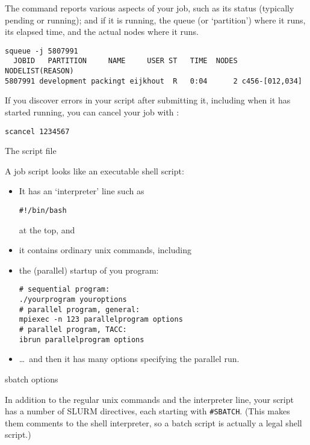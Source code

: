 The  command reports various aspects of your job,
such as its status (typically pending or running);
and if it is running, the queue (or `partition') where it runs,
its elapsed time, and the actual nodes where it runs.
\begin{verbatim}
squeue -j 5807991
  JOBID   PARTITION     NAME     USER ST   TIME  NODES NODELIST(REASON)
5807991 development packingt eijkhout  R   0:04      2 c456-[012,034]
\end{verbatim}

If you discover errors in your script after submitting it,
including when it has started running,
you can cancel your job with :
\begin{verbatim}
scancel 1234567
\end{verbatim}

 {The script file}

A job script looks like an executable shell script:
\begin{itemize}
\item It has an `interpreter' line such as
\begin{verbatim}
#!/bin/bash
\end{verbatim}
at the top, and
\item it contains ordinary unix commands, including
\item the (parallel) startup of you program:
\begin{verbatim}
# sequential program:
./yourprogram youroptions
# parallel program, general:
mpiexec -n 123 parallelprogram options
# parallel program, TACC:
ibrun parallelprogram options
\end{verbatim}
\item \ldots~and then it has many options specifying the parallel run.
\end{itemize}

 {sbatch options}

In addition to the regular unix commands and the interpreter line,
your script has a number of SLURM directives,
each starting with \verb+#SBATCH+. 
(This makes them comments to the shell interpreter,
so a batch script is actually a legal shell script.)

